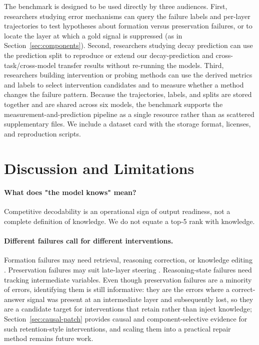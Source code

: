 \documentclass{article} %
\begin{document}
The benchmark is designed to be used directly by three audiences. First, researchers studying error mechanisms can query the failure labels and per-layer trajectories to test hypotheses about formation versus preservation failures, or to locate the layer at which a gold signal is suppressed (as in Section~\ref{sec:components}). Second, researchers studying decay prediction can use the prediction split to reproduce or extend our decay-prediction and cross-task/cross-model transfer results without re-running the models. Third, researchers building intervention or probing methods can use the derived metrics and labels to select intervention candidates and to measure whether a method changes the failure pattern. Because the trajectories, labels, and splits are stored together and are shared across six models, the benchmark supports the measurement-and-prediction pipeline as a single resource rather than as scattered supplementary files. We include a dataset card with the storage format, licenses, and reproduction scripts.

\section{Discussion and Limitations}

\paragraph{What does "the model knows" mean?}
Competitive decodability is an operational sign of output readiness, not a complete definition of knowledge. We do not equate a top-5 rank with knowledge.

\paragraph{Different failures call for different interventions.}
Formation failures may need retrieval, reasoning correction, or knowledge editing \citep{meng2022rome}. Preservation failures may suit late-layer steering \citep{turner2023activation, zou2023representation}. Reasoning-state failures need tracking intermediate variables. Even though preservation failures are a minority of errors, identifying them is still informative: they are the errors where a correct-answer signal was present at an intermediate layer and subsequently lost, so they are a candidate target for interventions that retain rather than inject knowledge; Section~\ref{sec:causal-patch} provides causal and component-selective evidence for such retention-style interventions, and scaling them into a practical repair method remains future work.
\end{document}
